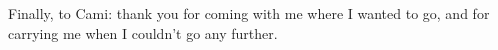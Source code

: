 Finally, to Cami: thank you for coming with me where I wanted to go, and for carrying me when I couldn't go any further.
%
%
%
%
%
%
%
% 
% 
% 
% 
% 
%
% 
% 
% 
% 
% 
%
